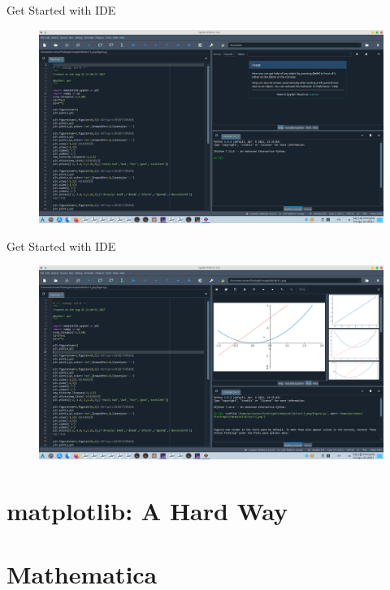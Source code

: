 \documentclass[aspectratio=1610]{beamer}
\numberwithin{equation}{section}
\begin{document}
\begin{frame}{Get Started with IDE}
	\begin{figure}
		\includegraphics[width=0.9\linewidth]{spyd.png}
	\end{figure}
\end{frame}

\begin{frame}{Get Started with IDE}
	\begin{figure}
		\includegraphics[width=0.9\linewidth]{spyd2.png}
	\end{figure}
\end{frame}

\section{matplotlib: A Hard Way}

\section{Mathematica}


\begin{frame}
~\vspace{50pt}\\



\end{frame}


%
%
%
\end{document}
